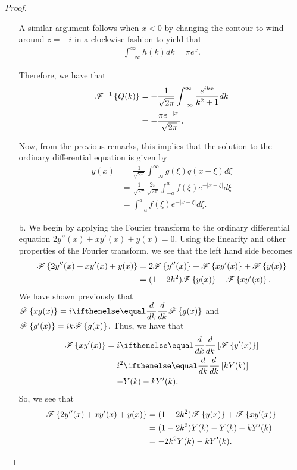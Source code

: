 \begin{proof}
\begin{enumerate}
      A similar argument follows when $x < 0$ by changing the contour to wind around $z=-i$ in a clockwise fashion to yield that
      \begin{align*}
        \int_{-\infty}^{\infty} h(k) dk = \pi e^{x}.
      \end{align*}

      Therefore, we have that
      \begin{align*}
        \mathscr{F}^{-1}\left\{ {Q(k)} \right\} &= -\frac{1}{\sqrt{2\pi}} \int_{-\infty}^{\infty} \frac{e^{i k x}}{k^2+1}  dk \\
        &= -\frac{\pi e^{-|x|}}{\sqrt{2\pi}}.
      \end{align*}

      Now, from the previous remarks, this implies that the solution to the ordinary
      differential equation is given by
      \begin{align*}
        y(x) &= \frac{1}{\sqrt{2\pi}}\int_{-\infty}^{\infty} g(\xi) q(x-\xi)d\xi \\
        &= \frac{1}{\sqrt{2\pi}}\frac{2\pi}{\sqrt{2\pi}}\int_{-a}^{a} f(\xi) e^{-|x-\xi|} d\xi \\
        &= \int_{-a}^{a} f(\xi) e^{-|x-\xi|} d\xi.
      \end{align*}
    \item[b.] We begin by applying the Fourier transform
      to the ordinary differential equation $2 y''(x) + x y'(x) + y(x) = 0$.
      Using the linearity and other properties of the Fourier transform, we see that the left hand side
      becomes
      \begin{align*}
        \mathscr{F}\left\{ {2 y''(x) + x y'(x) + y(x)} \right\}
        &= 2\mathscr{F}\left\{ {y''(x)} \right\} + \mathscr{F}\left\{ {xy'(x)} \right\} + \mathscr{F}\left\{ {y(x)} \right\} \\
        &= (1 - 2k^2)\mathscr{F}\left\{ {y(x)} \right\} + \mathscr{F}\left\{ {xy'(x)} \right\}.
      \end{align*}
      We have shown previously that $\displaystyle \fourier{x g(x)} = i \der{k}{} \fourier{g(x)}$
      and $\mathscr{F}\left\{ {g'(x)} \right\} = ik \mathscr{F}\left\{ {g(x)} \right\}$. Thus, we have that
      \begin{align*}
        \fourier{x y'(x)} &= i \der{k}{}\left[\fourier{y'(x)}\right] \\
        &= i^2\der{k}{}\left[kY(k)\right] \\
        &= - Y(k) - kY'(k).
      \end{align*}
      So, we see that
      \begin{align*}
        \mathscr{F}\left\{ {2 y''(x) + x y'(x) + y(x)} \right\}
        &= (1 - 2k^2)\mathscr{F}\left\{ {y(x)} \right\} + \mathscr{F}\left\{ {xy'(x)} \right\} \\
        &= (1-2k^2)Y(k) - Y(k) - kY'(k) \\
        &= -2k^2Y(k) - kY'(k).
      \end{align*}


\end{enumerate}
\end{proof}
